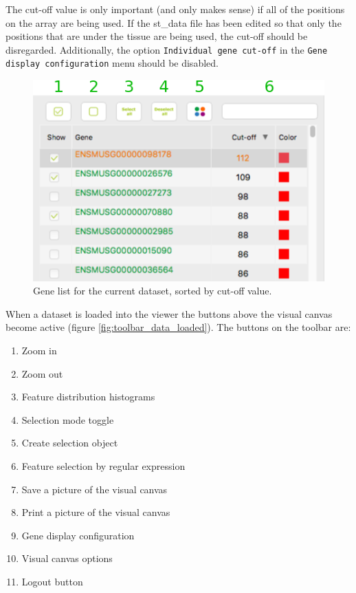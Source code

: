 \documentclass[10pt,a4paper,titlepage]{book}
\begin{document}
The cut-off value is only important (and only makes sense) if all of the positions on the array are being used. If the st\_data file has been edited so that only the positions that are under the tissue are being used, the cut-off should be disregarded. Additionally, the option \texttt{Individual gene cut-off} in the \texttt{Gene display configuration} menu should be disabled.

\begin{figure}[h]
	\centering
	\includegraphics[scale=0.7]{./Pictures/gene_list}
	\caption[Gene List]{Gene list for the current dataset, sorted by cut-off value.}
	\label{fig:gene_list}
\end{figure}

When a dataset is loaded into the viewer the buttons above the visual canvas become active (figure \ref{fig:toolbar_data_loaded}). The buttons on the toolbar are:
\begin{enumerate}
\item	Zoom in
\item	Zoom out
\item	Feature distribution histograms
\item	Selection mode toggle
\item	Create selection object
\item	Feature selection by regular expression
\item	Save a picture of the visual canvas
\item	Print a picture of the visual canvas
\item	Gene display configuration
\item	Visual canvas options
\item	Logout button
\end{enumerate}
\end{document}
